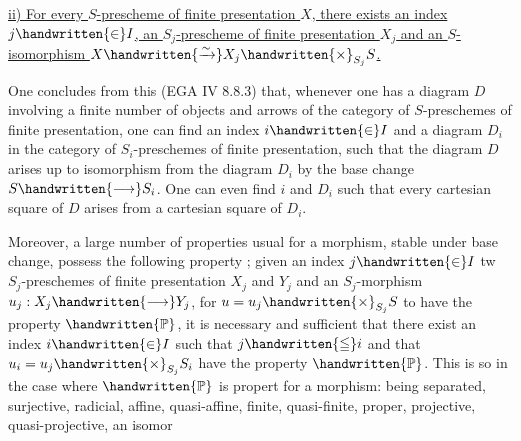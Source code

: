 \uline{ii) For every $S$-prescheme of finite presentation $X$, there exists an index $j\handwritten{\in}I$,  an $S_j$-prescheme of finite presentation $X_j$ and an $S$-isomorphism $X\handwritten{\xrightarrow{\sim}}X_j\handwritten{\times}_{S_j}S$.}

One concludes from this (EGA IV 8.8.3) that, whenever one has a diagram $D$ involving a finite number of objects and arrows of the category of $S$-preschemes of finite presentation, one can find an index $i\handwritten{\in}I$ and a diagram $D_i$ in the category of $S_i$-preschemes of finite presentation, such that the diagram $D$ arises up to isomorphism from the diagram $D_i$ by the base change $S\handwritten{\longrightarrow}S_i$. One can even find $i$ and $D_i$ such that every cartesian square of $D$ arises from a cartesian square of $D_i$.

 Moreover, a large number of properties  usual for a morphism, stable under base change, possess the following property ; given an index $j\handwritten{\in}I$ tw $S_j$-preschemes of finite presentation $X_j$ and $Y_j$ and an $S_j$-morphism $u_j:X_j\handwritten{\longrightarrow}Y_j$, for $u=u_j\handwritten{\times}_{S_j}S$ to have the property $\handwritten{\mathbb{P}}$, it is necessary and sufficient that there exist an index $i\handwritten{\in}I$ such that $j\handwritten{\leqq}i$ and that $u_i=u_j\handwritten{\times}_{S_j}S_i$ have the property $\handwritten{\mathbb{P}}$. This is so in the case where $\handwritten{\mathbb{P}}$ is   propert for a morphism: being separated, surjective, radicial, affine, quasi-affine, finite, quasi-finite, proper, projective, quasi-projective, an isomor%
